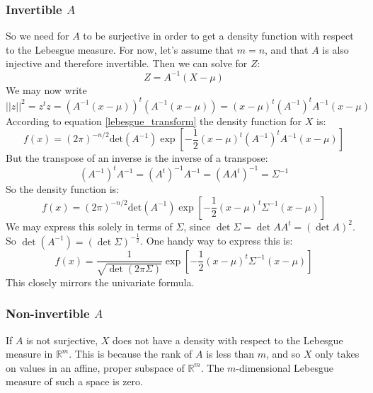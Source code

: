 \documentclass[12pt, a4paper]{article}
\numberwithin{equation}{section}
\begin{document}
\subsubsection{Invertible $A$}
So we need for $A$ to be surjective in order to get a density function with respect to the Lebesgue measure. For now, let's assume that $m=n$, and that $A$ is also injective and therefore invertible. Then we can solve for $Z$:
\begin{equation}
Z=A^{-1}(X-\mu)
\end{equation}
We may now write
\begin{equation}
||z||^2=z^t z=\left(A^{-1}(x-\mu)\right)^t\left(A^{-1}(x-\mu)\right)=(x-\mu)^t\left(A^{-1}\right)^t A^{-1}(x-\mu)
\end{equation}
According to equation \ref{lebesgue_transform} the density function for $X$ is:
\begin{equation}
f(x)=(2\pi)^{-n/2}\textrm{det}(A^{-1})\exp\left[-\frac{1}{2}(x-\mu)^t\left(A^{-1}\right)^t A^{-1}(x-\mu)\right]
\end{equation}
But the transpose of an inverse is the inverse of a transpose:
\begin{equation}
\left(A^{-1}\right)^t A^{-1}=(A^t)^{-1}A^{-1}=(AA^t)^{-1}=\Sigma^{-1}
\end{equation}
So the density function is:
\begin{equation}
f(x)=(2\pi)^{-n/2}\textrm{det}(A^{-1})\exp\left[-\frac{1}{2}(x-\mu)^t\Sigma^{-1}(x-\mu)\right]
\end{equation}
We may express this solely in terms of $\Sigma$, since $\det\Sigma=\det AA^t=(\det A)^2$. So $\det(A^{-1})=(\det\Sigma)^{-\frac{1}{2}}$. One handy way to express this is:
\begin{equation}
\label{mvn_density}
f(x)=\frac{1}{\sqrt{\det(2\pi\Sigma)}}\exp\left[-\frac{1}{2}(x-\mu)^t\Sigma^{-1}(x-\mu)\right]
\end{equation}
This closely mirrors the univariate formula.

\subsubsection{Non-invertible $A$}
If $A$ is not surjective, $X$ does not have a density with respect to the Lebesgue measure in $\mathbb{R}^m$. This is because the rank of $A$ is less than $m$, and so $X$ only takes on values in an affine, proper subspace of $\mathbb{R}^m$. The $m$-dimensional Lebesgue measure of such a space is zero.
\end{document}
